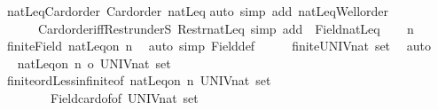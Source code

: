 \begin{isabellebody}
%
\endisadelimdocument
{}\isamarkupfalse%
\ natLeq{\isacharunderscore}{\kern0pt}Card{\isacharunderscore}{\kern0pt}order{\isacharcolon}{\kern0pt}\ {\isachardoublequoteopen}Card{\isacharunderscore}{\kern0pt}order\ natLeq{\isachardoublequoteclose}\isanewline
%
\isadelimproof
%
\endisadelimproof
%
\isatagproof
{}\isamarkupfalse%
{\isacharparenleft}{\kern0pt}auto\ simp\ add{\isacharcolon}{\kern0pt}\ natLeq{\isacharunderscore}{\kern0pt}Well{\isacharunderscore}{\kern0pt}order\isanewline
\ \ \ \ \ \ Card{\isacharunderscore}{\kern0pt}order{\isacharunderscore}{\kern0pt}iff{\isacharunderscore}{\kern0pt}Restr{\isacharunderscore}{\kern0pt}underS\ Restr{\isacharunderscore}{\kern0pt}natLeq{}{\isacharcomma}{\kern0pt}\ simp\ add{\isacharcolon}{\kern0pt}\ \ Field{\isacharunderscore}{\kern0pt}natLeq{\isacharparenright}{\kern0pt}\isanewline
\ \ \isamarkupfalse%
\ n\ \isamarkupfalse%
\ {\isachardoublequoteopen}finite{\isacharparenleft}{\kern0pt}Field\ {\isacharparenleft}{\kern0pt}natLeq{\isacharunderscore}{\kern0pt}on\ n{\isacharparenright}{\kern0pt}{\isacharparenright}{\kern0pt}{\isachardoublequoteclose}\ \isamarkupfalse%
\ {\isacharparenleft}{\kern0pt}auto\ simp{\isacharcolon}{\kern0pt}\ Field{\isacharunderscore}{\kern0pt}def{\isacharparenright}{\kern0pt}\isanewline
\ \ \isamarkupfalse%
\ \isamarkupfalse%
\ {\isachardoublequoteopen}{\isasymnot}finite{\isacharparenleft}{\kern0pt}UNIV{\isacharcolon}{\kern0pt}{\isacharcolon}{\kern0pt}nat\ set{\isacharparenright}{\kern0pt}{\isachardoublequoteclose}\ \isamarkupfalse%
\ auto\isanewline
\ \ \isamarkupfalse%
\ \isamarkupfalse%
\ {\isachardoublequoteopen}natLeq{\isacharunderscore}{\kern0pt}on\ n\ {\isacharless}{\kern0pt}o\ {\isacharbar}{\kern0pt}UNIV{\isacharcolon}{\kern0pt}{\isacharcolon}{\kern0pt}nat\ set{\isacharbar}{\kern0pt}{\isachardoublequoteclose}\isanewline
\ \ \isamarkupfalse%
\ finite{\isacharunderscore}{\kern0pt}ordLess{\isacharunderscore}{\kern0pt}infinite{\isacharbrackleft}{\kern0pt}of\ {\isachardoublequoteopen}natLeq{\isacharunderscore}{\kern0pt}on\ n{\isachardoublequoteclose}\ {\isachardoublequoteopen}{\isacharbar}{\kern0pt}UNIV{\isacharcolon}{\kern0pt}{\isacharcolon}{\kern0pt}nat\ set{\isacharbar}{\kern0pt}{\isachardoublequoteclose}{\isacharbrackright}{\kern0pt}\isanewline
\ \ \ \ \ \ \ \ Field{\isacharunderscore}{\kern0pt}card{\isacharunderscore}{\kern0pt}of{\isacharbrackleft}{\kern0pt}of\ {\isachardoublequoteopen}UNIV{\isacharcolon}{\kern0pt}{\isacharcolon}{\kern0pt}nat\ set{\isachardoublequoteclose}{\isacharbrackright}{\kern0pt}\isanewline

\end{isabellebody}
